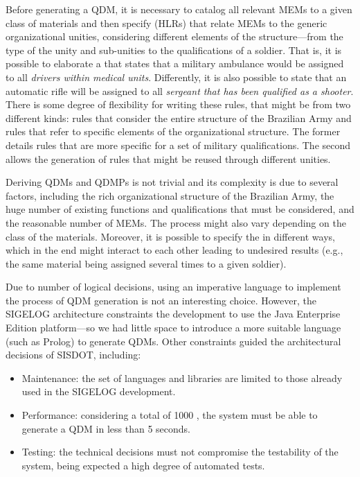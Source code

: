 Before generating a QDM, it is necessary to catalog all relevant MEMs to a given 
class of materials and then specify \callers (HLRs) that relate MEMs to the generic organizational 
unities, considering different elements of the structure---from the type of the unity and 
sub-unities to the qualifications of a soldier. That is, it is possible to elaborate a 
\shc that states that a military ambulance would be assigned to all \emph{drivers within medical units}. 
Differently, it is also possible to state that an automatic rifle will be assigned to all \emph{sergeant that has 
been qualified as a shooter}. There is some degree of flexibility for writing these 
rules, that might be from two different kinds: rules that consider the entire structure 
of the Brazilian Army and rules that refer to specific elements of the organizational 
structure. The former details rules that are more specific for a set of military qualifications. The second allows 
the generation of rules that might be reused through different unities. 

Deriving QDMs and QDMPs is not trivial and its complexity is due to several 
factors, including the rich organizational structure of the Brazilian Army, 
the huge number of existing functions and qualifications that must be 
considered, and the reasonable number of MEMs. The process might also vary 
depending on the class of the materials. Moreover, it is possible to specify the  
\callers in different ways, which in the end might interact to each other leading 
to undesired results (e.g., the same material being assigned several times 
to a given soldier). 

Due to number of logical decisions, using an imperative language to implement the process of QDM generation 
is not an interesting choice. However, the SIGELOG architecture constraints the development 
to use the Java Enterprise Edition platform---so we had little space to introduce a 
more suitable language (such as Prolog) to generate QDMs. Other constraints guided 
the architectural decisions of SISDOT, including:  

\begin{itemize}
\item Maintenance: the set of languages and libraries are limited to those already used in the SIGELOG development.  
\item Performance: considering a total of 1000 \callers, the system must be able to generate a QDM in less than 5 seconds.
\item Testing: the technical decisions must not compromise the testability of the system, being expected a high degree of automated tests. 
\end{itemize}

